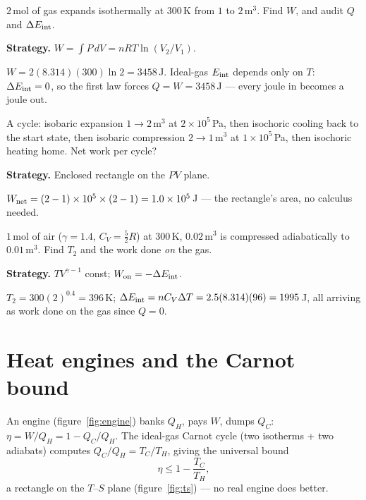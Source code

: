 \begin{example}\label{ex:iso}
$2$\,mol of gas expands isothermally at $300$\,K from $1$ to $2$\,m$^{3}$.
Find $W$, and audit $Q$ and $\Delta E_{\rm int}$.
\par\smallskip
\textbf{Strategy.} $W=\int P\,dV=nRT\ln(V_2/V_1)$.
\begin{solution}
$W=2(8.314)(300)\ln2=3458$\,J. Ideal-gas $E_{\rm int}$ depends only on
$T$: $\Delta E_{\rm int}=0$, so the first law forces
$Q=W=3458$\,J --- every joule in becomes a joule out.
\checkmark
\end{solution}
\end{example}

\begin{example}\label{ex:cyc}
A cycle: isobaric expansion $1\to2$\,m$^{3}$ at $2\times10^{5}$\,Pa,
then isochoric cooling back to the start state, then isobaric
compression $2\to1$\,m$^{3}$ at $1\times10^{5}$\,Pa, then isochoric
heating home. Net work per cycle?
\par\smallskip
\textbf{Strategy.} Enclosed rectangle on the $PV$ plane.
\begin{solution}
$W_{\rm net}=(2-1)\times10^{5}\times(2-1)=1.0\times10^{5}$\,J --- the
rectangle's area, no calculus needed. \checkmark
\end{solution}
\end{example}

\begin{example}\label{ex:adiab}
$1$\,mol of air ($\gamma=1.4$, $C_V=\tfrac52R$) at $300$\,K, $0.02$\,m$^{3}$
is compressed adiabatically to $0.01$\,m$^{3}$. Find $T_2$ and the work
done \emph{on} the gas.
\par\smallskip
\textbf{Strategy.} $TV^{\gamma-1}$ const; $W_{\rm on}=-\Delta E_{\rm int}$.
\begin{solution}
$T_2=300(2)^{0.4}=396$\,K; $\Delta E_{\rm int}=nC_V\Delta T
=2.5(8.314)(96)=1995$\,J, all arriving as work done on the gas since
$Q=0$. \checkmark
\end{solution}
\end{example}

\section{Heat engines and the Carnot bound}\label{sec:th-carnot}

An engine (figure~\ref{fig:engine}) banks $Q_H$, pays $W$, dumps $Q_C$:
$\eta=W/Q_H=1-Q_C/Q_H$. The ideal-gas Carnot cycle (two isotherms + two
adiabats) computes $Q_C/Q_H=T_C/T_H$, giving the universal bound
\begin{equation}
  \eta\le1-\frac{T_C}{T_H},\label{eq:carnot}
\end{equation}
a rectangle on the $T$--$S$ plane (figure~\ref{fig:ts}) --- no real
engine does better.

